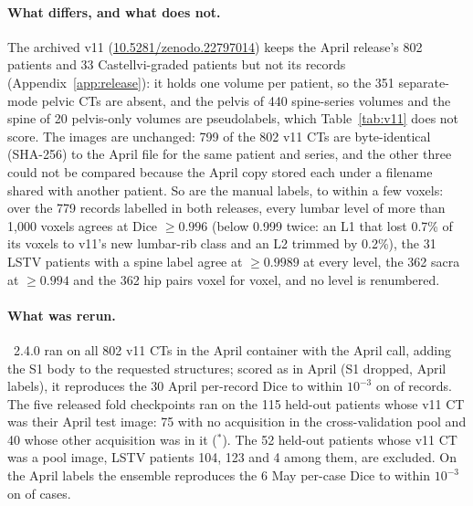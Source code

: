 \paragraph{What differs, and what does not.}
The archived v11
(\href{https://doi.org/10.5281/zenodo.22797014}{10.5281/zenodo.22797014})
keeps the April release's 802 patients and 33
Castellvi-graded patients but not its records
(Appendix~\ref{app:release}): it holds one volume per
patient, so the 351 separate-mode pelvic CTs are absent,
and the pelvis of 440 spine-series volumes and the spine
of 20 pelvis-only volumes are pseudolabels, which
Table~\ref{tab:v11} does not score. The images are
unchanged: 799 of the 802 v11 CTs are byte-identical
(SHA-256) to the April file for the same patient and
series, and the other three could not be compared because
the April copy stored each under a filename shared with
another patient. So are the manual labels, to within a
few voxels: over the 779 records labelled in both
releases, every lumbar level of more than 1{,}000 voxels
agrees at Dice $\geq 0.996$ (below 0.999 twice: an L1
that lost 0.7\% of its voxels to v11's new lumbar-rib
class and an L2 trimmed by 0.2\%), the 31 LSTV patients
with a spine label agree at $\geq 0.9989$ at every level,
the 362 sacra at $\geq 0.994$ and the 362 hip pairs voxel
for voxel, and no level is renumbered.

\paragraph{What was rerun.}
\sota{}~2.4.0 ran on all 802 v11 CTs in the April
container with the April call, adding the S1 body to the
requested structures; scored as in April (S1 dropped,
April labels), it reproduces the 30 April per-record Dice
to within $10^{-3}$ on \PENDING{} of \PENDING{} records.
The five released fold checkpoints ran on the 115
held-out patients whose v11 CT was their April test
image: 75 with no acquisition in the cross-validation
pool and 40 whose other acquisition was in it ($^\ast$).
The 52 held-out patients whose v11 CT was a pool image,
LSTV patients 104, 123 and 4 among them, are excluded. On
the April labels the ensemble reproduces the 6 May
per-case Dice to within $10^{-3}$ on \PENDING{} of \PENDING{}
cases.


